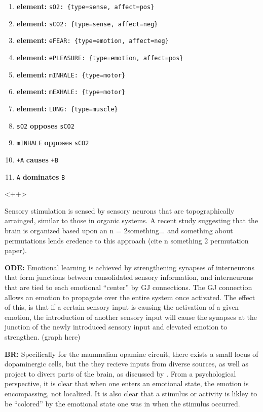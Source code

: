 \documentclass[letterpaper]{article}
\begin{document}
\begin{enumerate}
    \item \textbf{element:} \texttt{sO2: \{type=sense, affect=pos\}}
    \item \textbf{element:} \texttt{sCO2: \{type=sense, affect=neg\}}
    \item \textbf{element:} \texttt{eFEAR: \{type=emotion, affect=neg\}}
    \item \textbf{element:} \texttt{ePLEASURE: \{type=emotion, affect=pos\}}
    \item \textbf{element:} \texttt{mINHALE: \{type=motor\}}
    \item \textbf{element:} \texttt{mEXHALE: \{type=motor\}}
    \item \textbf{element:} \texttt{LUNG: \{type=muscle\}}
    \item \texttt{sO2} \textbf{opposes} \texttt{sCO2}
    \item \texttt{mINHALE} \textbf{opposes} \texttt{sCO2}
    \item \texttt{+A} \textbf{causes} \texttt{+B}
    \item \texttt{A} \textbf{dominates} \texttt{B}
\end{enumerate}<++>



Sensory stimulation is sensed by sensory neurons that are topographically arrainged, similar to those in organic systems. A recent study suggesting that the brain is organized based upon an n = 2something... and something about permutations lends credence to this approach (cite n something 2 permutation paper).


\textbf{ODE:} Emotional learning is achieved by strengthening synapses of interneurons that form junctions between consolidated sensory information, and interneurons that are tied to each emotional ``center'' by GJ connections. The GJ connection allows an emotion to propagate over the entire system once activated. The effect of this, is that if a certain sensory input is causing the activation of a given emotion, the introduction of another sensory input will cause the synapses at the junction of the newly introduced sensory input and elevated emotion to strengthen. (graph here)

\textbf{BR:} Specifically for the mammalian opamine circuit, there exists a small locus of dopaminergic cells, but the they recieve inputs from diverse sources, as well as project to divers parts of the brain, as discussed by \citet{Beir2015}. From a psychological perspective, it is clear that when one enters an emotional state, the emotion is encompassing, not localized. It is also clear that a stimulus or activity is likley to be ``colored'' by the emotional state one was in when the stimulus occurred.
\end{document}
